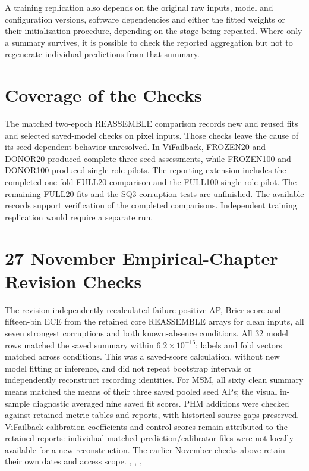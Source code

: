 A training replication also depends on the original raw inputs, model and configuration
versions, software dependencies and either the fitted weights or their initialization
procedure, depending on the stage being repeated. Where only a summary survives, it is
possible to check the reported aggregation but not to regenerate individual predictions
from that summary.

\section{Coverage of the Checks}
The matched two-epoch REASSEMBLE comparison records new and reused fits and selected
saved-model checks on pixel inputs. Those checks leave the cause of its seed-dependent
behavior unresolved. In ViFailback, FROZEN20 and DONOR20 produced complete three-seed
assessments, while FROZEN100 and DONOR100 produced single-role pilots. The reporting
extension includes the completed one-fold FULL20 comparison and the FULL100 single-role
pilot. The remaining FULL20 fits and the SQ3 corruption tests are unfinished. The
available records support verification of the completed comparisons. Independent
training replication would require a separate run.

\section{27 November Empirical-Chapter Revision Checks}
The revision independently recalculated failure-positive AP, Brier score and fifteen-bin
ECE from the retained core REASSEMBLE arrays for clean inputs, all seven strongest
corruptions and both known-absence conditions. All 32 model rows matched the saved
summary within $6.2\times10^{-16}$; labels and fold vectors matched across conditions.
This was a saved-score calculation, without new model fitting or inference, and did not
repeat bootstrap intervals or independently reconstruct recording identities.
For MSM, all sixty clean summary means matched the means of their three saved pooled
seed APs; the visual in-sample diagnostic averaged nine saved fit scores.
PHM additions were checked against retained metric tables and reports, with historical
source gaps preserved. ViFailback calibration coefficients and control scores remain
attributed to the retained reports: individual matched prediction/calibrator files were
not locally available for a new reconstruction. The earlier November checks above
retain their own dates and access scope.
{, , , }


